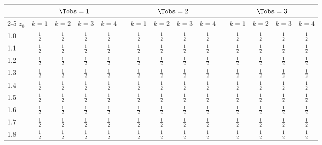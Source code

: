 \begin{tabular}{@{}l cccc c cccc c cccc@{}}
\toprule
 & \multicolumn{4}{c}{$\Tobs=1$} & & \multicolumn{4}{c}{$\Tobs=2$} & & \multicolumn{4}{c}{$\Tobs=3$}\\
\cmidrule{2-5}\cmidrule{7-10}\cmidrule{12-15}
$z_0$ & $k{=}1$ & $k{=}2$ & $k{=}3$ & $k{=}4$ & & $k{=}1$ & $k{=}2$ & $k{=}3$ & $k{=}4$ & & $k{=}1$ & $k{=}2$ & $k{=}3$ & $k{=}4$\\
\midrule
1.0 & $\tfrac{1}{2}$ & $\tfrac{1}{2}$ & $\tfrac{1}{2}$ & $\tfrac{1}{2}$ & & $\tfrac{1}{2}$ & $\tfrac{1}{2}$ & $\tfrac{1}{2}$ & $\tfrac{1}{2}$ & & $\tfrac{1}{2}$ & $\tfrac{1}{2}$ & $\tfrac{1}{2}$ & $\tfrac{1}{2}$\\
1.1 & $\tfrac{1}{2}$ & $\tfrac{1}{2}$ & $\tfrac{1}{2}$ & $\tfrac{1}{2}$ & & $\tfrac{1}{2}$ & $\tfrac{1}{2}$ & $\tfrac{1}{2}$ & $\tfrac{1}{2}$ & & $\tfrac{1}{2}$ & $\tfrac{1}{2}$ & $\tfrac{1}{2}$ & $\tfrac{1}{2}$\\
1.2 & $\tfrac{1}{2}$ & $\tfrac{1}{2}$ & $\tfrac{1}{2}$ & $\tfrac{1}{2}$ & & $\tfrac{1}{2}$ & $\tfrac{1}{2}$ & $\tfrac{1}{2}$ & $\tfrac{1}{2}$ & & $\tfrac{1}{2}$ & $\tfrac{1}{2}$ & $\tfrac{1}{2}$ & $\tfrac{1}{2}$\\
1.3 & $\tfrac{1}{2}$ & $\tfrac{1}{2}$ & $\tfrac{1}{2}$ & $\tfrac{1}{2}$ & & $\tfrac{1}{2}$ & $\tfrac{1}{2}$ & $\tfrac{1}{2}$ & $\tfrac{1}{2}$ & & $\tfrac{1}{2}$ & $\tfrac{1}{2}$ & $\tfrac{1}{2}$ & $\tfrac{1}{2}$\\
1.4 & $\tfrac{1}{2}$ & $\tfrac{1}{2}$ & $\tfrac{1}{2}$ & $\tfrac{1}{2}$ & & $\tfrac{1}{2}$ & $\tfrac{1}{2}$ & $\tfrac{1}{2}$ & $\tfrac{1}{2}$ & & $\tfrac{1}{2}$ & $\tfrac{1}{2}$ & $\tfrac{1}{2}$ & $\tfrac{1}{2}$\\
1.5 & $\tfrac{1}{2}$ & $\tfrac{1}{2}$ & $\tfrac{1}{2}$ & $\tfrac{1}{2}$ & & $\tfrac{1}{2}$ & $\tfrac{1}{2}$ & $\tfrac{1}{2}$ & $\tfrac{1}{2}$ & & $\tfrac{1}{2}$ & $\tfrac{1}{2}$ & $\tfrac{1}{2}$ & $\tfrac{1}{2}$\\
1.6 & $\tfrac{1}{2}$ & $\tfrac{1}{2}$ & $\tfrac{1}{2}$ & $\tfrac{1}{2}$ & & $\tfrac{1}{2}$ & $\tfrac{1}{2}$ & $\tfrac{1}{2}$ & $\tfrac{1}{2}$ & & $\tfrac{1}{2}$ & $\tfrac{1}{2}$ & $\tfrac{1}{2}$ & $\tfrac{1}{2}$\\
1.7 & $\tfrac{1}{2}$ & $\tfrac{1}{2}$ & $\tfrac{1}{2}$ & $\tfrac{1}{2}$ & & $\tfrac{1}{2}$ & $\tfrac{1}{2}$ & $\tfrac{1}{2}$ & $\tfrac{1}{2}$ & & $\tfrac{1}{2}$ & $\tfrac{1}{2}$ & $\tfrac{1}{2}$ & $\tfrac{1}{2}$\\
1.8 & $\tfrac{1}{2}$ & $\tfrac{1}{2}$ & $\tfrac{1}{2}$ & $\tfrac{1}{2}$ & & $\tfrac{1}{2}$ & $\tfrac{1}{2}$ & $\tfrac{1}{2}$ & $\tfrac{1}{2}$ & & $\tfrac{1}{2}$ & $\tfrac{1}{2}$ & $\tfrac{1}{2}$ & $\tfrac{1}{2}$\\

\end{tabular}
